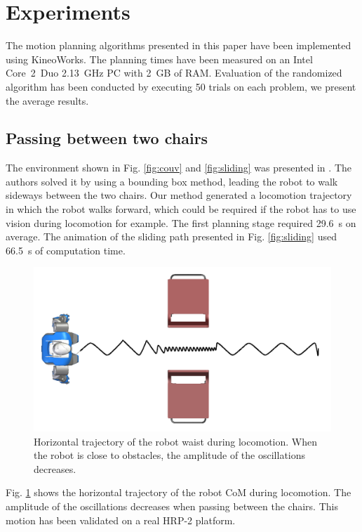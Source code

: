 \documentclass{article}
\begin{document}
\section{Experiments}

\label{sec:exp}

The motion planning algorithms presented in this paper have been implemented
using KineoWorks\texttrademark \cite{laumond2006kcs}. The planning times have been measured
on an Intel Core~2~Duo 2.13~GHz PC with 2~GB of RAM. Evaluation of the
randomized algorithm has been conducted by executing 50 trials on each
problem, we present the average results.


\subsection{Passing between two chairs}


The environment shown in Fig. \ref{fig:couv} and \ref{fig:sliding} was
presented in \cite{el2011path}. The  authors solved it by using a bounding
box method, leading the robot to walk sideways between the two chairs.
Our method generated a locomotion  trajectory in which the robot walks
forward, which could be required if the robot has to use vision during
locomotion for  example. The first planning stage  required 29.6~s
on  average.   The  animation  of   the  sliding  path   presented  in
Fig.   \ref{fig:sliding}    used   66.5~s  of  computation   time.


\begin{figure}[h!]
\centering
\includegraphics[width=0.7\linewidth]{pics/chairs/waist-trajectory.png}

\caption{Horizontal trajectory of the robot waist during
  locomotion. When the robot is close to obstacles, the amplitude of
  the oscillations decreases.}
\label{fig:chairs-waist}
\end{figure}



Fig.  \ref{fig:chairs-waist} shows  the horizontal  trajectory  of the
robot CoM  during  locomotion. The amplitude of the oscillations  decreases when passing
between the  chairs.  This motion has  been validated on  a real HRP-2
platform. 
\end{document}
